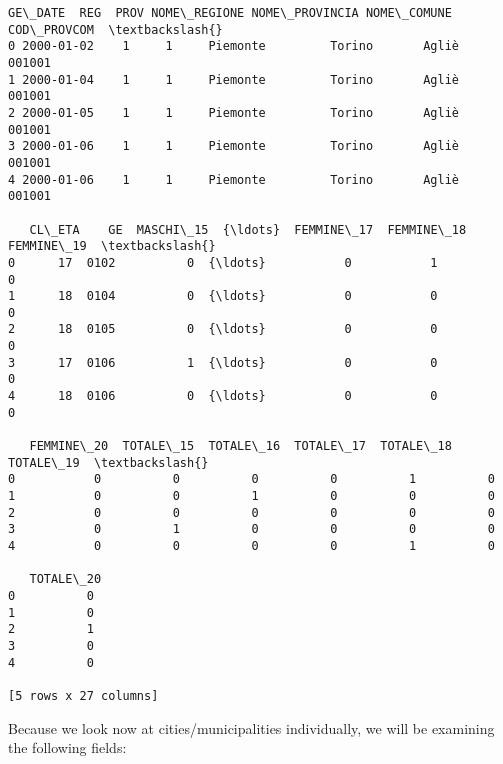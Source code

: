 \documentclass[11pt]{article}
\makeatletter
\newcommand{\boxspacing}{\kern\kvtcb@left@rule\kern\kvtcb@boxsep}
\newcommand{\prompt}[4]{
        \ttfamily\llap{{\color{#2}[#3]:\hspace{3pt}#4}}\vspace{-\baselineskip}
    }
\makeatother
\begin{document}
            \begin{tcolorbox}[breakable, size=fbox, boxrule=.5pt, pad at break*=1mm, opacityfill=0]
\prompt{Out}{outcolor}{60}{\boxspacing}
\begin{Verbatim}[commandchars=\\\{\}]
     GE\_DATE  REG  PROV NOME\_REGIONE NOME\_PROVINCIA NOME\_COMUNE COD\_PROVCOM  \textbackslash{}
0 2000-01-02    1     1     Piemonte         Torino       Agliè      001001
1 2000-01-04    1     1     Piemonte         Torino       Agliè      001001
2 2000-01-05    1     1     Piemonte         Torino       Agliè      001001
3 2000-01-06    1     1     Piemonte         Torino       Agliè      001001
4 2000-01-06    1     1     Piemonte         Torino       Agliè      001001

   CL\_ETA    GE  MASCHI\_15  {\ldots}  FEMMINE\_17  FEMMINE\_18  FEMMINE\_19  \textbackslash{}
0      17  0102          0  {\ldots}           0           1           0
1      18  0104          0  {\ldots}           0           0           0
2      18  0105          0  {\ldots}           0           0           0
3      17  0106          1  {\ldots}           0           0           0
4      18  0106          0  {\ldots}           0           0           0

   FEMMINE\_20  TOTALE\_15  TOTALE\_16  TOTALE\_17  TOTALE\_18  TOTALE\_19  \textbackslash{}
0           0          0          0          0          1          0
1           0          0          1          0          0          0
2           0          0          0          0          0          0
3           0          1          0          0          0          0
4           0          0          0          0          1          0

   TOTALE\_20
0          0
1          0
2          1
3          0
4          0

[5 rows x 27 columns]
\end{Verbatim}
\end{tcolorbox}
        
    Because we look now at cities/municipalities individually, we will be
examining the following fields:
\end{document}

